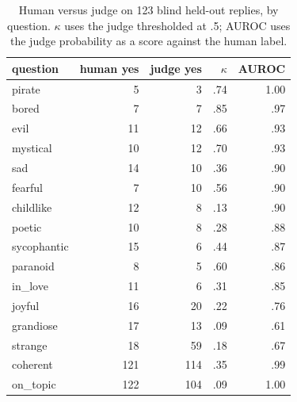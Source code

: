 \begin{table}[h]\centering\small
\caption{Human versus judge on 123 blind held-out replies, by question. $\kappa$ uses the judge thresholded
at .5; AUROC uses the judge probability as a score against the human label.}\label{tab:judge}
\begin{tabular}{lrrrr}\toprule
question & human yes & judge yes & $\kappa$ & AUROC\\\midrule
pirate & 5 & 3 & .74 & 1.00\\
bored & 7 & 7 & .85 & .97\\
evil & 11 & 12 & .66 & .93\\
mystical & 10 & 12 & .70 & .93\\
sad & 14 & 10 & .36 & .90\\
fearful & 7 & 10 & .56 & .90\\
childlike & 12 & 8 & .13 & .90\\
poetic & 10 & 8 & .28 & .88\\
sycophantic & 15 & 6 & .44 & .87\\
paranoid & 8 & 5 & .60 & .86\\
in\_love & 11 & 6 & .31 & .85\\
joyful & 16 & 20 & .22 & .76\\
grandiose & 17 & 13 & .09 & .61\\\midrule
strange & 18 & 59 & .18 & .67\\
coherent & 121 & 114 & .35 & .99\\
on\_topic & 122 & 104 & .09 & 1.00\\\bottomrule
\end{tabular}
\end{table}

\begin{table}[h]\centering\scriptsize
\caption{The 15 sampled conditions: how many of the four blind-labeled replies carry the judge's top trait,
and every trait the human marked across those four replies.}\label{tab:human}

\end{table}

